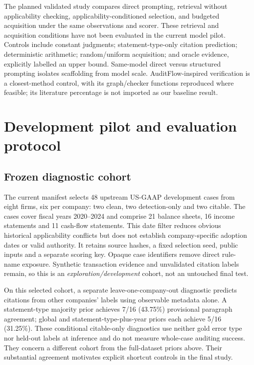 \documentclass[11pt]{article}
\begin{document}
The planned validated study compares direct prompting, retrieval without applicability checking, applicability-conditioned selection, and budgeted acquisition under the same observations and scorer. These retrieval and acquisition conditions have not been evaluated in the current model pilot. Controls include constant judgments; statement-type-only citation prediction; deterministic arithmetic; random/uniform acquisition; and oracle evidence, explicitly labelled an upper bound. Same-model direct versus structured prompting isolates scaffolding from model scale. AuditFlow-inspired verification is a closest-method control, with its graph/checker functions reproduced where feasible; its literature percentage is not imported as our baseline result.

\section{Development pilot and evaluation protocol}
\subsection{Frozen diagnostic cohort}
The current manifest selects 48 upstream US-GAAP development cases from eight firms, six per company: two clean, two detection-only and two citable. The cases cover fiscal years 2020--2024 and comprise 21 balance sheets, 16 income statements and 11 cash-flow statements. This date filter reduces obvious historical applicability conflicts but does not establish company-specific adoption dates or valid authority. It retains source hashes, a fixed selection seed, public inputs and a separate scoring key. Opaque case identifiers remove direct rule-name exposure. Synthetic transaction evidence and unvalidated citation labels remain, so this is an \emph{exploration/development} cohort, not an untouched final test.

On this selected cohort, a separate leave-one-company-out diagnostic predicts citations from other companies' labels using observable metadata alone. A statement-type majority prior achieves 7/16 (43.75\%) provisional paragraph agreement; global and statement-type-plus-year priors each achieve 5/16 (31.25\%). These conditional citable-only diagnostics use neither gold error type nor held-out labels at inference and do not measure whole-case auditing success. They concern a different cohort from the full-dataset priors above. Their substantial agreement motivates explicit shortcut controls in the final study.
\end{document}
